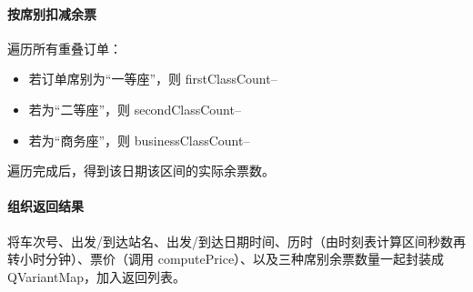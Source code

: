 \documentclass{article}
\begin{document}
			\paragraph{按席别扣减余票} 遍历所有重叠订单：
			\begin{itemize}
			\item 若订单席别为“一等座”，则 firstClassCount--
			\item 若为“二等座”，则 secondClassCount--
			\item 若为“商务座”，则 businessClassCount--
			\end{itemize}
			遍历完成后，得到该日期该区间的实际余票数。
			
			\paragraph{组织返回结果} 将车次号、出发/到达站名、出发/到达日期时间、历时（由时刻表计算区间秒数再转小时分钟）、票价（调用 computePrice）、以及三种席别余票数量一起封装成 QVariantMap，加入返回列表。
			\newline
			
\end{document}
